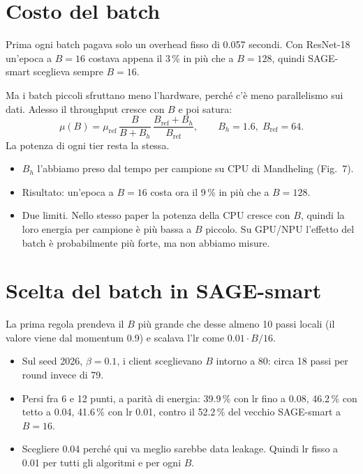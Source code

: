 \documentclass[10pt,a4paper]{article}
\begin{document}
\section{Costo del batch}

Prima ogni batch pagava solo un overhead fisso di 0.057 secondi. Con ResNet-18
un'epoca a $B = 16$ costava appena il 3\,\% in più che a $B = 128$, quindi
SAGE-smart sceglieva sempre $B = 16$.

Ma i batch piccoli sfruttano meno l'hardware, perché c'è meno parallelismo sui
dati. Adesso il throughput cresce con $B$ e poi satura:
\[
  \mu(B) = \mu_{\mathrm{ref}} \, \frac{B}{B + B_h} \,
  \frac{B_{\mathrm{ref}} + B_h}{B_{\mathrm{ref}}},
  \qquad B_h = 1.6, \; B_{\mathrm{ref}} = 64.
\]
La potenza di ogni tier resta la stessa.

\begin{itemize}
  \item $B_h$ l'abbiamo preso dal tempo per campione su CPU di Mandheling
        (Fig.~7).
  \item Risultato: un'epoca a $B = 16$ costa ora il 9\,\% in più che a $B =
        128$.
  \item Due limiti. Nello stesso paper la potenza della CPU cresce con $B$,
        quindi la loro energia per campione è più bassa a $B$ piccolo. Su
        GPU/NPU l'effetto del batch è probabilmente più forte, ma non abbiamo
        misure.
\end{itemize}

\section{Scelta del batch in SAGE-smart}

La prima regola prendeva il $B$ più grande che desse almeno 10 passi locali (il
valore viene dal momentum 0.9) e scalava l'lr come $0.01 \cdot B/16$.

\begin{itemize}
  \item Sul seed 2026, $\beta = 0.1$, i client sceglievano $B$ intorno a 80:
        circa 18 passi per round invece di 79.
  \item Persi fra 6 e 12 punti, a parità di energia: 39.9\,\% con lr fino a
        0.08, 46.2\,\% con tetto a 0.04, 41.6\,\% con lr 0.01, contro il
        52.2\,\% del vecchio SAGE-smart a $B = 16$.
  \item Scegliere 0.04 perché qui va meglio sarebbe data leakage. Quindi lr fisso
        a 0.01 per tutti gli algoritmi e per ogni $B$.
\end{itemize}
\end{document}
